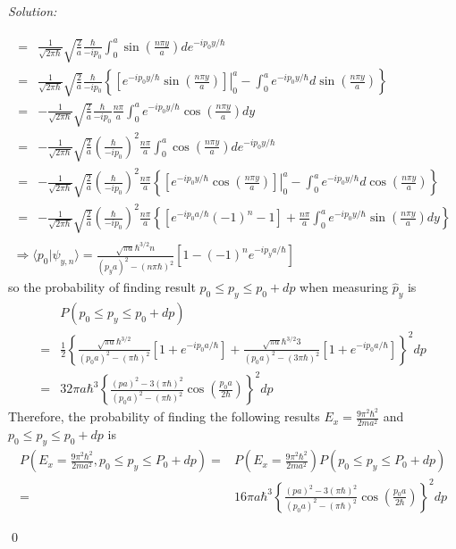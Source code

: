 \documentclass[12pt,a4paper]{article}
\newenvironment{sol}
    {\emph{Solution:}
    }
    {
    \qed
    }
\begin{document}
\begin{sol}
\begin{itemize}
\begin{itemize}
\begin{gather}
\begin{align}
\nonumber=&\frac{1}{\sqrt{2\pi\hbar}}\sqrt{\frac{2}{a}}\frac{\hbar}{-ip_0}\int_0^a\sin\left(\frac{n\pi y}{a}\right)de^{-ip_0y/\hbar}\\
\nonumber=&\frac{1}{\sqrt{2\pi\hbar}}\sqrt{\frac{2}{a}}\frac{\hbar}{-ip_0}\left\{\left.\left[e^{-ip_0y/\hbar}\sin\left(\frac{n\pi y}{a}\right)\right]\right|_0^a-\int_0^ae^{-ip_0y/\hbar}d\sin\left(\frac{n\pi y}{a}\right)\right\}\\
\nonumber=&-\frac{1}{\sqrt{2\pi\hbar}}\sqrt{\frac{2}{a}}\frac{\hbar}{-ip_0}\frac{n\pi}{a}\int_0^ae^{-ip_0y/\hbar}\cos\left(\frac{n\pi y}{a}\right)dy\\
\nonumber=&-\frac{1}{\sqrt{2\pi\hbar}}\sqrt{\frac{2}{a}}\left(\frac{\hbar}{-ip_0}\right)^2\frac{n\pi}{a}\int_0^a\cos\left(\frac{n\pi y}{a}\right)de^{-ip_0y/\hbar}\\
\nonumber=&-\frac{1}{\sqrt{2\pi\hbar}}\sqrt{\frac{2}{a}}\left(\frac{\hbar}{-ip_0}\right)^2\frac{n\pi}{a}\left\{\left.\left[e^{-ip_0y/\hbar}\cos\left(\frac{n\pi y}{a}\right)\right]\right|_0^a-\int_0^ae^{-ip_0y/\hbar}d\cos\left(\frac{n\pi y}{a}\right)\right\}\\
=&-\frac{1}{\sqrt{2\pi\hbar}}\sqrt{\frac{2}{a}}\left(\frac{\hbar}{-ip_0}\right)^2\frac{n\pi}{a}\left\{\left[e^{-ip_0a/\hbar}(-1)^n-1\right]+\frac{n\pi}{a}\int_0^ae^{-ip_0y/\hbar}\sin\left(\frac{n\pi y}{a}\right)dy\right\}
\end{align}\\
\Longrightarrow\langle p_0|\psi_{y,n}\rangle=\frac{\sqrt{\pi a}\hbar^{3/2}n}{(p_ya)^2-(n\pi\hbar)^2}\left[1-(-1)^ne^{-ip_ya/\hbar}\right]
\end{gather}\normalsize
so the probability of finding result $p_0\leq p_y\leq p_0+dp$ when measuring $\hat{p}_y$ is
\begin{align}
\nonumber&P(p_0\leq p_y\leq p_0+dp)\\
\nonumber=&\frac{1}{2}\left\{\frac{\sqrt{\pi a}\hbar^{3/2}}{(p_0a)^2-(\pi\hbar)^2}\left[1+e^{-ip_0a/\hbar}\right]+\frac{\sqrt{\pi a}\hbar^{3/2}3}{(p_0a)^2-(3\pi\hbar)^2}\left[1+e^{-ip_0a/\hbar}\right]\right\}^2dp\\
=&32\pi a\hbar^3\left\{\frac{(pa)^2-3(\pi\hbar)^2}{(p_0a)^2-(\pi\hbar)^2}\cos\left(\frac{p_0a}{2\hbar}\right)\right\}^2dp
\end{align}
Therefore, the probability of finding the following results $E_x=\frac{9\pi^2\hbar^2}{2ma^2}$ and $p_0\leq p_y\leq p_0+dp$ is
\small\begin{align}
\nonumber P\left(E_x=\frac{9\pi^2\hbar^2}{2ma^2},p_0\leq p_y\leq P_0+dp\right)=&P\left(E_x=\frac{9\pi^2\hbar^2}{2ma^2}\right)P(p_0\leq p_y\leq P_0+dp)\\
=&16\pi a\hbar^3\left\{\frac{(pa)^2-3(\pi\hbar)^2}{(p_0a)^2-(\pi\hbar)^2}\cos\left(\frac{p_0a}{2\hbar}\right)\right\}^2dp
\end{align}\normalsize
\end{itemize}
\end{itemize}
\end{sol}
\end{document}
